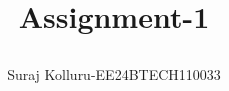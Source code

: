 \documentclass[journal,12pt,twocolumn]{IEEEtran}
\theoremstyle{remark}
\begin{document}
%




\vspace{3cm}

\title{
\\
\large{Assignment-1}


}
\author{Suraj Kolluru-EE24BTECH110033}


	


%
%
%

% 
%



% 
\end{document}
